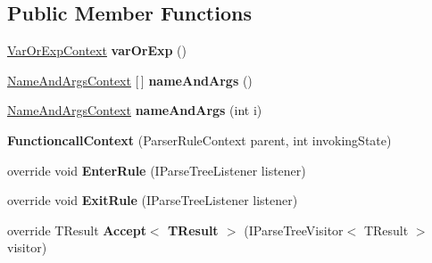 \subsection*{Public Member Functions}
\begin{DoxyCompactItemize}
\item 
\mbox{\label{classzlua_1_1_lua_parser_1_1_functioncall_context_a4e2acf6c90255d632a65bb075b538554}} 
\mbox{\hyperlink{classzlua_1_1_lua_parser_1_1_var_or_exp_context}{Var\+Or\+Exp\+Context}} {\bfseries var\+Or\+Exp} ()
\item 
\mbox{\label{classzlua_1_1_lua_parser_1_1_functioncall_context_a41aeb4e095435d6ec7fc25f5d6520875}} 
\mbox{\hyperlink{classzlua_1_1_lua_parser_1_1_name_and_args_context}{Name\+And\+Args\+Context}} \mbox{[}$\,$\mbox{]} {\bfseries name\+And\+Args} ()
\item 
\mbox{\label{classzlua_1_1_lua_parser_1_1_functioncall_context_a946850fdebae4f9a1d5262f0ee254fea}} 
\mbox{\hyperlink{classzlua_1_1_lua_parser_1_1_name_and_args_context}{Name\+And\+Args\+Context}} {\bfseries name\+And\+Args} (int i)
\item 
\mbox{\label{classzlua_1_1_lua_parser_1_1_functioncall_context_a0cc61367967c5893883a5d798dcd0449}} 
{\bfseries Functioncall\+Context} (Parser\+Rule\+Context parent, int invoking\+State)
\item 
\mbox{\label{classzlua_1_1_lua_parser_1_1_functioncall_context_a5e13cc76081cd0e42d6a84f8c85d9542}} 
override void {\bfseries Enter\+Rule} (I\+Parse\+Tree\+Listener listener)
\item 
\mbox{\label{classzlua_1_1_lua_parser_1_1_functioncall_context_a9c9506792fc7ae68f7a069ef03651c62}} 
override void {\bfseries Exit\+Rule} (I\+Parse\+Tree\+Listener listener)
\item 
\mbox{\label{classzlua_1_1_lua_parser_1_1_functioncall_context_a65b5ed4b733c1fc9788fcd78620a95a6}} 
override T\+Result {\bfseries Accept$<$ T\+Result $>$} (I\+Parse\+Tree\+Visitor$<$ T\+Result $>$ visitor)
\end{DoxyCompactItemize}
